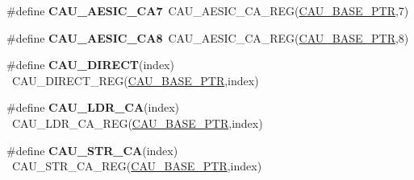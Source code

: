 \begin{DoxyCompactItemize}
\item 
\hypertarget{group___c_a_u___register___accessor___macros_ga7a5bb23409f386f1d5e3404bbc32dab7}{}\#define {\bfseries C\+A\+U\+\_\+\+A\+E\+S\+I\+C\+\_\+\+C\+A7}~C\+A\+U\+\_\+\+A\+E\+S\+I\+C\+\_\+\+C\+A\+\_\+\+R\+E\+G(\hyperlink{group___c_a_u___peripheral_gaf2a80b84a866e513ee484bbb861fa36d}{C\+A\+U\+\_\+\+B\+A\+S\+E\+\_\+\+P\+T\+R},7)\label{group___c_a_u___register___accessor___macros_ga7a5bb23409f386f1d5e3404bbc32dab7}

\item 
\hypertarget{group___c_a_u___register___accessor___macros_gade19c2e76f27877cc91b6a5a097cc758}{}\#define {\bfseries C\+A\+U\+\_\+\+A\+E\+S\+I\+C\+\_\+\+C\+A8}~C\+A\+U\+\_\+\+A\+E\+S\+I\+C\+\_\+\+C\+A\+\_\+\+R\+E\+G(\hyperlink{group___c_a_u___peripheral_gaf2a80b84a866e513ee484bbb861fa36d}{C\+A\+U\+\_\+\+B\+A\+S\+E\+\_\+\+P\+T\+R},8)\label{group___c_a_u___register___accessor___macros_gade19c2e76f27877cc91b6a5a097cc758}

\item 
\hypertarget{group___c_a_u___register___accessor___macros_ga902412832d21567056a42aa735158669}{}\#define {\bfseries C\+A\+U\+\_\+\+D\+I\+R\+E\+C\+T}(index)                                            ~C\+A\+U\+\_\+\+D\+I\+R\+E\+C\+T\+\_\+\+R\+E\+G(\hyperlink{group___c_a_u___peripheral_gaf2a80b84a866e513ee484bbb861fa36d}{C\+A\+U\+\_\+\+B\+A\+S\+E\+\_\+\+P\+T\+R},index)\label{group___c_a_u___register___accessor___macros_ga902412832d21567056a42aa735158669}

\item 
\hypertarget{group___c_a_u___register___accessor___macros_ga1d3cb9b968c6ce403680607779c7799a}{}\#define {\bfseries C\+A\+U\+\_\+\+L\+D\+R\+\_\+\+C\+A}(index)                                            ~C\+A\+U\+\_\+\+L\+D\+R\+\_\+\+C\+A\+\_\+\+R\+E\+G(\hyperlink{group___c_a_u___peripheral_gaf2a80b84a866e513ee484bbb861fa36d}{C\+A\+U\+\_\+\+B\+A\+S\+E\+\_\+\+P\+T\+R},index)\label{group___c_a_u___register___accessor___macros_ga1d3cb9b968c6ce403680607779c7799a}

\item 
\hypertarget{group___c_a_u___register___accessor___macros_gaf12f02b8511d89d25a84131250c00c34}{}\#define {\bfseries C\+A\+U\+\_\+\+S\+T\+R\+\_\+\+C\+A}(index)                                            ~C\+A\+U\+\_\+\+S\+T\+R\+\_\+\+C\+A\+\_\+\+R\+E\+G(\hyperlink{group___c_a_u___peripheral_gaf2a80b84a866e513ee484bbb861fa36d}{C\+A\+U\+\_\+\+B\+A\+S\+E\+\_\+\+P\+T\+R},index)\label{group___c_a_u___register___accessor___macros_gaf12f02b8511d89d25a84131250c00c34}


\end{DoxyCompactItemize}
